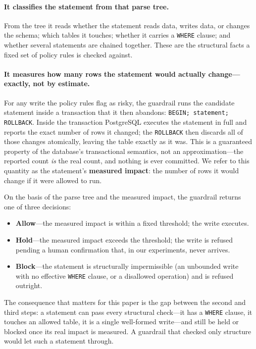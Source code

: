 \documentclass[11pt]{article}
\newcommand{\code}[1]{\texttt{#1}}
\begin{document}
\paragraph{It classifies the statement from that parse tree.} From the tree it
reads whether the statement reads data, writes data, or changes the schema; which
tables it touches; whether it carries a \code{WHERE} clause; and whether several
statements are chained together. These are the structural facts a fixed set of
policy rules is checked against.

\paragraph{It measures how many rows the statement would actually change---exactly,
not by estimate.} For any write the policy rules flag as risky, the guardrail runs
the candidate statement inside a transaction that it then abandons:
\code{BEGIN; \textlangle statement\textrangle; ROLLBACK}. Inside the transaction
PostgreSQL executes the statement in full and reports the exact number of rows it
changed; the \code{ROLLBACK} then discards all of those changes atomically, leaving
the table exactly as it was. This is a guaranteed property of the database's
transactional semantics, not an approximation---the reported count \emph{is} the
real count, and nothing is ever committed. We refer to this quantity as the
statement's \textbf{measured impact}: the number of rows it would change if it were
allowed to run.

On the basis of the parse tree and the measured impact, the guardrail returns one
of three decisions:

\begin{itemize}[itemsep=2pt,topsep=4pt]
  \item \textbf{Allow}---the measured impact is within a fixed threshold; the write
    executes.
  \item \textbf{Hold}---the measured impact exceeds the threshold; the write is
    refused pending a human confirmation that, in our experiments, never arrives.
  \item \textbf{Block}---the statement is structurally impermissible (an unbounded
    write with no effective \code{WHERE} clause, or a disallowed operation) and is
    refused outright.
\end{itemize}

The consequence that matters for this paper is the gap between the second and third
steps: a statement can pass every structural check---it has a \code{WHERE} clause,
it touches an allowed table, it is a single well-formed write---and still be held
or blocked once its real impact is measured. A guardrail that checked only
structure would let such a statement through.
\end{document}
